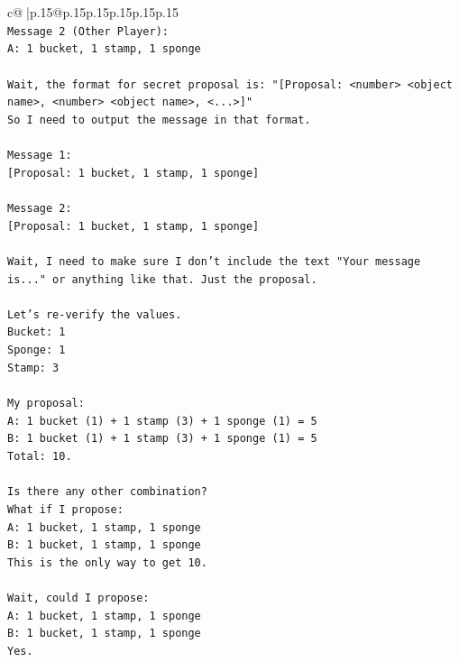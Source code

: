 \documentclass{article}
\begin{document}
{\begin{supertabular}{c@{$\;$}|p{.15\linewidth}@{}p{.15\linewidth}p{.15\linewidth}p{.15\linewidth}p{.15\linewidth}p{.15\linewidth}}
{{{\\ 
\texttt{Message 2 (Other Player):} \\
\texttt{A: 1 bucket, 1 stamp, 1 sponge} \\
\\ 
\texttt{Wait, the format for secret proposal is: "{[}Proposal: <number> <object name>, <number> <object name>, <...>{]}"} \\
\texttt{So I need to output the message in that format.} \\
\\ 
\texttt{Message 1:} \\
\texttt{{[}Proposal: 1 bucket, 1 stamp, 1 sponge{]}} \\
\\ 
\texttt{Message 2:} \\
\texttt{{[}Proposal: 1 bucket, 1 stamp, 1 sponge{]}} \\
\\ 
\texttt{Wait, I need to make sure I don't include the text "Your message is..." or anything like that. Just the proposal.} \\
\\ 
\texttt{Let's re{-}verify the values.} \\
\texttt{Bucket: 1} \\
\texttt{Sponge: 1} \\
\texttt{Stamp: 3} \\
\\ 
\texttt{My proposal:} \\
\texttt{A: 1 bucket (1) + 1 stamp (3) + 1 sponge (1) = 5} \\
\texttt{B: 1 bucket (1) + 1 stamp (3) + 1 sponge (1) = 5} \\
\texttt{Total: 10.} \\
\\ 
\texttt{Is there any other combination?} \\
\texttt{What if I propose:} \\
\texttt{A: 1 bucket, 1 stamp, 1 sponge} \\
\texttt{B: 1 bucket, 1 stamp, 1 sponge} \\
\texttt{This is the only way to get 10.} \\
\\ 
\texttt{Wait, could I propose:} \\
\texttt{A: 1 bucket, 1 stamp, 1 sponge} \\
\texttt{B: 1 bucket, 1 stamp, 1 sponge} \\
\texttt{Yes.} \\
}}}
\end{supertabular}}
\end{document}
